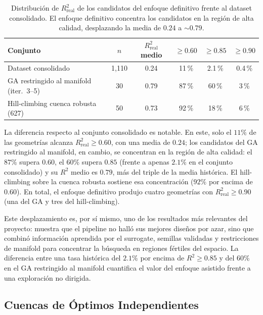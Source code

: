 \begin{table}[H]
\centering
\small
\begin{tabular}{lccccc}
\toprule
\textbf{Conjunto} & \textbf{$n$} & \textbf{$R^2_{\text{real}}$ medio} & \textbf{$\geq 0.60$} & \textbf{$\geq 0.85$} & \textbf{$\geq 0.90$} \\
\midrule
Dataset consolidado                          & 1{,}110 & 0.24 & 11\,\% & 2.1\,\% & 0.4\,\% \\
GA restringido al manifold (iter.\ 3--5)     & 30      & 0.79 & 87\,\% & 60\,\%  & 3\,\%   \\
Hill-climbing cuenca robusta (627)           & 50      & 0.73 & 92\,\% & 18\,\%  & 6\,\%   \\
\bottomrule
\end{tabular}
\caption{Distribución de $R^2_{\text{real}}$ de los candidatos del enfoque definitivo frente al dataset consolidado. El enfoque definitivo concentra los candidatos en la región de alta calidad, desplazando la media de $0.24$ a ${\sim}0.79$.}
\label{tab:convergencia}
\end{table}

La diferencia respecto al conjunto consolidado es notable. En este, solo el $11\%$ de las geometrías alcanza $R^2_{\text{real}} \geq 0.60$, con una media de $0.24$; los candidatos del GA restringido al manifold, en cambio, se concentran en la región de alta calidad: el $87\%$ supera $0.60$, el $60\%$ supera $0.85$ (frente a apenas $2.1\%$ en el conjunto consolidado) y su $R^2$ medio es $0.79$, más del triple de la media histórica. El hill-climbing sobre la cuenca robusta sostiene esa concentración ($92\%$ por encima de $0.60$). En total, el enfoque definitivo produjo cuatro geometrías con $R^2_{\text{real}} \geq 0.90$ (una del GA y tres del hill-climbing).

Este desplazamiento es, por sí mismo, uno de los resultados más relevantes del proyecto: muestra que el pipeline no halló sus mejores diseños por azar, sino que combinó información aprendida por el surrogate, semillas validadas y restricciones de manifold para concentrar la búsqueda en regiones fértiles del espacio. La diferencia entre una tasa histórica del $2.1\%$ por encima de $R^2 \geq 0.85$ y del $60\%$ en el GA restringido al manifold cuantifica el valor del enfoque asistido frente a una exploración no dirigida.

\subsection{Cuencas de Óptimos Independientes}\label{subsec:cuencas}

